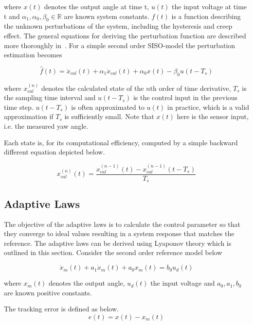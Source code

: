 where $x(t)$ denotes the output angle at time t, $u(t)$ the input voltage at time t and $\alpha_1, \alpha_0, \beta_0 \in \mathbb{R}$ are known system constants. $f(t)$ is a function describing the unknown perturbations of the system, including the hysteresis and creep effect. The general equations for deriving the perturbation function are described more thoroughly in~\citep{Elmali:1996}. For a simple second order SISO-model the perturbation estimation becomes

\begin{equation}
  \label{eq:perturbation}
  \hat{f}(t) = \ddot{x}_{cal}(t) + \alpha_1\dot{x}_{cal}(t) +  \alpha_0x(t) - \beta_0u(t-T_s)
\end{equation}

where $x_{cal}^{(n)}$ denotes the calculated state of the $n$th order of time derivative, $T_s$ is the sampling time interval and $u(t-T_s)$ is the control input in the previous time step. $u(t-T_s)$ is often approximated to $u(t)$ in practice, which is a valid approximation if $T_s$ is sufficiently small. Note that $x(t)$ here is the sensor input, i.e. the measured yaw angle.

Each state is, for its computational efficiency, computed by a simple backward different equation depicted below.

\begin{equation}
  \label{eq:backward}
  x_{cal}^{(n)}(t) = \frac{x_{cal}^{(n-1)}(t) - x_{cal}^{(n-1)}(t-T_s)}{T_s}
\end{equation}

\subsection{Adaptive Laws}
The objective of the adaptive laws is to calculate the control parameter so that they converge to ideal values resulting in a system response that matches the reference. The adaptive laws can be derived using Lyaponov theory which is outlined in this section. Consider the second order reference model below

\begin{equation}
  \label{eq:refmodel}
  \ddot{x}_m(t) + a_1\dot{x}_m(t) +  a_0x_m(t) = b_0u_d(t)
\end{equation}

where $x_m(t)$ denotes the output angle, $u_d(t)$ the input voltage and $a_0, a_1, b_0$ are known positive constants.

The tracking error is defined as below.
\begin{equation}
  \label{eq:stateerror}
  e(t) = x(t) - x_m(t)
\end{equation}

